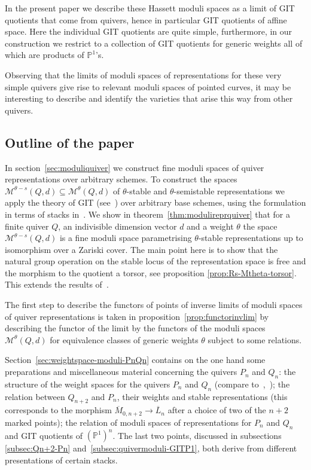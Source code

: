 \documentclass[ALCO,ThmDefs,Unicode,epreuves]{cedram}
\def\P{\mathds P}
\begin{document}
In the present paper we describe these Hassett moduli spaces as a limit of 
GIT quotients that come from quivers, hence in particular GIT quotients of 
affine space. Here the individual GIT quotients are quite simple, furthermore, 
in our construction we restrict to a collection of GIT quotients for generic 
weights all of which are products of $\P^1$'s.


Observing that the limits of moduli spaces of representations 
for these very simple quivers give rise to relevant moduli spaces of pointed curves,
it may be interesting to describe and identify the varieties that 
arise this way from other quivers.


\subsection*{Outline of the paper}
In section~\ref {sec:moduliquiver} we construct fine moduli spaces of quiver 
representations over arbitrary schemes. To construct the spaces 
$\mathcal M^{\theta-s}(Q,d)\subseteq\mathcal M^\theta(Q,d)$ of $\theta$-stable 
and $\theta$-semistable representations we apply the theory of GIT (see~\cite{MFK}) 
over arbitrary base schemes, using the formulation in terms of stacks in~\cite{Al14}.
We show in theorem~\ref{thm:modulireprquiver} that for a finite quiver $Q$, 
an indivisible dimension vector $d$ and a weight $\theta$ the space 
$\mathcal M^{\theta-s}(Q,d)$ is a fine moduli space parametrising $\theta$-stable 
representations up to isomorphism over a Zariski cover. The main point here is 
to show that the natural group operation on the stable locus of the representation 
space is free and the morphism to the quotient a torsor, see proposition 
\ref{prop:Rs-Mtheta-torsor}. This extends the results of~\cite{Ki94}.

The first step to describe the functors of points of inverse limits of 
moduli spaces of quiver representations is taken in proposition~\ref{prop:functorinvlim}
by describing the functor of the limit by the functors of the moduli spaces
$\mathcal M^\theta(Q,d)$ for equivalence classes of generic weights $\theta$ 
subject to some relations. 


Section~\ref{sec:weightspace-moduli-PnQn} contains on the one hand some preparations 
and miscellaneous material concerning the quivers $P_n$ and $Q_n$: 
the structure of the weight spaces for the quivers $P_n$ and $Q_n$ 
(compare to~\cite[(1.2),(1.3)]{Ka93a},~\cite[7.3.C]{GKZ});
the relation between $Q_{n+2}$ and $P_n$, their weights and stable representations
(this corresponds to the morphism $\overline{M}_{0,n+2}\to\overline{L}_n$ after 
a choice of two of the $n+2$ marked points);
the relation of moduli spaces of representations for $P_n$ and $Q_n$ and 
GIT quotients of $(\P^1)^n$. The last two points, discussed in subsections
\ref{subsec:Qn+2-Pn} and~\ref{subsec:quivermoduli-GITP1}, both derive from 
different presentations of certain stacks.
\end{document}
